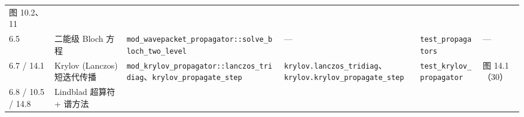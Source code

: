 \documentclass[
]{ctexbook}
\begin{document}
\begin{longtable}[]{@{}llllll@{}}
\begin{minipage}[t]{0.14\columnwidth}
图 10.2、11\strut
\end{minipage}\tabularnewline
\begin{minipage}[t]{0.14\columnwidth}\raggedright
6.5\strut
\end{minipage} & \begin{minipage}[t]{0.14\columnwidth}\raggedright
二能级 Bloch 方程\strut
\end{minipage} & \begin{minipage}[t]{0.14\columnwidth}\raggedright
\texttt{mod\_wavepacket\_propagator::solve\_bloch\_two\_level}\strut
\end{minipage} & \begin{minipage}[t]{0.14\columnwidth}\raggedright
---\strut
\end{minipage} & \begin{minipage}[t]{0.14\columnwidth}\raggedright
\texttt{test\_propagators}\strut
\end{minipage} & \begin{minipage}[t]{0.14\columnwidth}\raggedright
---\strut
\end{minipage}\tabularnewline
\begin{minipage}[t]{0.14\columnwidth}\raggedright
6.7 / 14.1\strut
\end{minipage} & \begin{minipage}[t]{0.14\columnwidth}\raggedright
Krylov (Lanczos) 短迭代传播\strut
\end{minipage} & \begin{minipage}[t]{0.14\columnwidth}\raggedright
\texttt{mod\_krylov\_propagator::lanczos\_tridiag}、\texttt{krylov\_propagate\_step}\strut
\end{minipage} & \begin{minipage}[t]{0.14\columnwidth}\raggedright
\texttt{krylov.lanczos\_tridiag}、\texttt{krylov.krylov\_propagate\_step}\strut
\end{minipage} & \begin{minipage}[t]{0.14\columnwidth}\raggedright
\texttt{test\_krylov\_propagator}\strut
\end{minipage} & \begin{minipage}[t]{0.14\columnwidth}\raggedright
图 14.1（30）\strut
\end{minipage}\tabularnewline
\begin{minipage}[t]{0.14\columnwidth}\raggedright
6.8 / 10.5 / 14.8\strut
\end{minipage} & \begin{minipage}[t]{0.14\columnwidth}\raggedright
Lindblad 超算符 + 谱方法\strut

\end{minipage}
\end{longtable}
\end{document}
